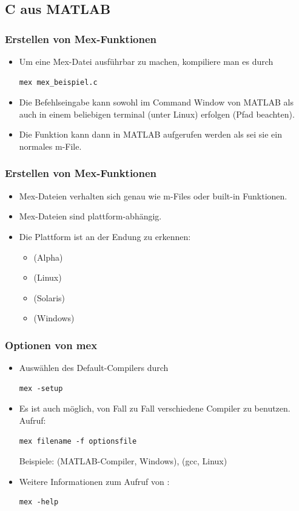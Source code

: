 \documentclass[hyperref={xetex}]{beamer}
\begin{document}
\subsection{C aus MATLAB}
%
%
\begin{frame}[fragile]\frametitle{Erstellen von Mex-Funktionen}
\begin{itemize}
\item Um eine Mex-Datei  ausf\"uhrbar zu machen, kompiliere
man es durch 
\begin{lstlisting}
mex mex_beispiel.c
\end{lstlisting}
\item Die Befehlseingabe kann sowohl im Command Window von  MATLAB als auch in einem beliebigen
  terminal (unter Linux) erfolgen (Pfad beachten).
\item Die Funktion kann dann in MATLAB aufgerufen werden als sei sie ein normales
m-File.
\end{itemize}
\end{frame}
%
%
\begin{frame}[fragile]\frametitle{Erstellen von Mex-Funktionen}
\begin{itemize}
\item Mex-Dateien verhalten sich genau wie m-Files oder built-in Funktionen.
\item Mex-Dateien sind plattform-abh\"angig.
\item Die Plattform ist an der Endung zu erkennen:
\begin{itemize}
 \item {} (Alpha)
\item {} (Linux)
\item {} (Solaris)
\item {} (Windows)
\end{itemize}
\end{itemize}
\end{frame}
%
%
\begin{frame}[fragile]\frametitle{Optionen von mex}
\begin{itemize}
\item Ausw\"ahlen des Default-Compilers durch
\begin{lstlisting}
mex -setup
\end{lstlisting}
\item Es ist auch m\"oglich, von Fall zu Fall verschiedene Compiler zu
  benutzen. Aufruf:
\begin{lstlisting}
mex filename -f optionsfile
\end{lstlisting}
Beispiele:  (MATLAB-Compiler, Windows),
 (gcc, Linux) 
\item Weitere Informationen zum Aufruf von :
\begin{lstlisting}
mex -help
\end{lstlisting}
\end{itemize}
\end{frame}
%
\end{document}
